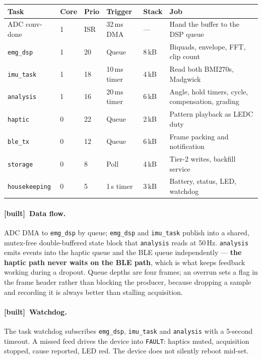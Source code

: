 \documentclass[11pt]{article}
\newcommand{\built}{{\sffamily\scriptsize\color{good}\textbf{[built]}}\ }
\begin{document}
\begin{table}[H]
\centering\small
\begin{tabularx}{\linewidth}{@{}p{24mm} p{8mm} p{10mm} p{20mm} p{10mm} X@{}}
\toprule
\textbf{Task} & \textbf{Core} & \textbf{Prio} & \textbf{Trigger} & \textbf{Stack} & \textbf{Job} \\
\midrule
ADC conv-done & 1 & ISR & 32\,ms DMA & --- & Hand the buffer to the DSP queue \\
\texttt{emg\_dsp} & 1 & 20 & Queue & 8\,kB & Biquads, envelope, FFT, clip count \\
\texttt{imu\_task} & 1 & 18 & 10\,ms timer & 4\,kB & Read both BMI270s, Madgwick \\
\texttt{analysis} & 1 & 16 & 20\,ms timer & 6\,kB & Angle, hold timers, cycle, compensation, grading \\
\texttt{haptic} & 0 & 22 & Queue & 2\,kB & Pattern playback as LEDC duty \\
\texttt{ble\_tx} & 0 & 12 & Queue & 6\,kB & Frame packing and notification \\
\texttt{storage} & 0 & 8 & Poll & 4\,kB & Tier-2 writes, backfill service \\
\texttt{housekeeping} & 0 & 5 & 1\,s timer & 3\,kB & Battery, status, LED, watchdog \\
\bottomrule
\end{tabularx}
\end{table}

\paragraph{\built Data flow.} ADC DMA to \texttt{emg\_dsp} by queue;
\texttt{emg\_dsp} and \texttt{imu\_task} publish into a shared, mutex-free
double-buffered state block that \texttt{analysis} reads at 50\,Hz.
\texttt{analysis} emits events into the haptic queue and the BLE queue
independently --- \textbf{the haptic path never waits on the BLE path}, which
is what keeps feedback working during a dropout. Queue depths are four frames;
an overrun sets a flag in the frame header rather than blocking the producer,
because dropping a sample and recording it is always better than stalling
acquisition.

\paragraph{\built Watchdog.} The task watchdog subscribes \texttt{emg\_dsp},
\texttt{imu\_task} and \texttt{analysis} with a 5-second timeout. A missed feed
drives the device into \texttt{FAULT}: haptics muted, acquisition stopped,
cause reported, LED red. The device does not silently reboot mid-set.
\end{document}
